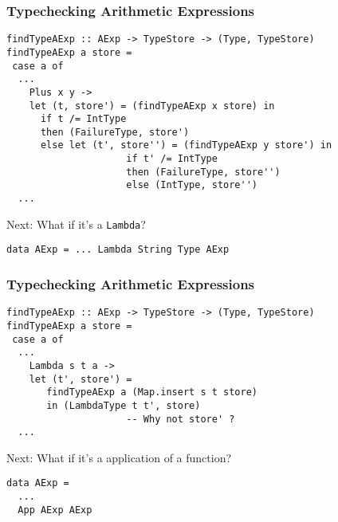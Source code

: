 \documentclass{beamer}
\begin{document}
\begin{frame}[fragile]
\frametitle{Typechecking Arithmetic Expressions}
\begin{verbatim}
findTypeAExp :: AExp -> TypeStore -> (Type, TypeStore)
findTypeAExp a store =
 case a of
  ...
    Plus x y -> 
    let (t, store') = (findTypeAExp x store) in
      if t /= IntType 
      then (FailureType, store')
      else let (t', store'') = (findTypeAExp y store') in
                     if t' /= IntType
                     then (FailureType, store'')
                     else (IntType, store'')
  ...
\end{verbatim}


\vfill
\pause

Next: What if it's a {\tt Lambda}?
\begin{verbatim}
data AExp = ... Lambda String Type AExp
\end{verbatim}
\end{frame}

\begin{frame}[fragile]
\frametitle{Typechecking Arithmetic Expressions}
\begin{verbatim}
findTypeAExp :: AExp -> TypeStore -> (Type, TypeStore)
findTypeAExp a store =
 case a of
  ...
    Lambda s t a -> 
    let (t', store') = 
       findTypeAExp a (Map.insert s t store) 
       in (LambdaType t t', store)                    
                     -- Why not store' ?
  ...
\end{verbatim}


\vfill
\pause

Next: What if it's a application of a function?
\begin{verbatim}
data AExp =
  ...
  App AExp AExp
\end{verbatim}
\end{frame}
\end{document}
